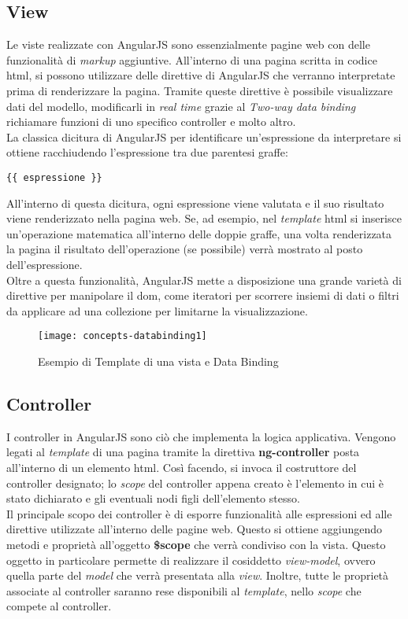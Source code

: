 \subsection{View}
Le viste realizzate con AngularJS sono essenzialmente pagine web con delle funzionalità di \emph{markup} aggiuntive. All'interno di una pagina scritta in codice \gls{html}, si possono utilizzare delle direttive di AngularJS che verranno interpretate prima di renderizzare la pagina. Tramite queste direttive è possibile visualizzare dati del modello, modificarli in \emph{real time} grazie al \emph{Two-way data binding} richiamare funzioni di uno specifico controller e molto altro.\\
La classica dicitura di AngularJS per identificare un'espressione da interpretare si ottiene racchiudendo l'espressione tra due parentesi graffe: 
\begin{verbatim}
{{ espressione }}
\end{verbatim}
All'interno di questa dicitura, ogni espressione viene valutata e il suo risultato viene renderizzato nella pagina web. Se, ad esempio, nel \emph{template} \gls{html} si inserisce un'operazione matematica all'interno delle doppie graffe, una volta renderizzata la pagina il risultato dell'operazione (se possibile) verrà mostrato al posto dell'espressione.\\
Oltre a questa funzionalità, AngularJS mette a disposizione una grande varietà di direttive per manipolare il \gls{dom}\glsfirstoccur, come iteratori per scorrere insiemi di dati o filtri da applicare ad una collezione per limitarne la visualizzazione.

\begin{figure}[!h] 
    \centering 
    \texttt{[image: concepts-databinding1]} 
    \caption{Esempio di Template di una vista e Data Binding}
\end{figure}

\subsection{Controller}
I controller in AngularJS sono ciò che implementa la logica applicativa. Vengono legati al \emph{template} di una pagina tramite la direttiva \textbf{ng-controller} posta all'interno di un elemento \gls{html}. Così facendo, si invoca il costruttore del controller designato; lo \emph{scope} del controller appena creato è l'elemento in cui è stato dichiarato e gli eventuali nodi figli dell'elemento stesso.\\
Il principale scopo dei controller è di esporre funzionalità alle espressioni ed alle direttive utilizzate all'interno delle pagine web. Questo si ottiene aggiungendo metodi e proprietà all'oggetto \textbf{\$scope} che verrà condiviso con la vista. Questo oggetto in particolare permette di realizzare il cosiddetto \emph{view-model}, ovvero quella parte del \emph{model} che verrà presentata alla \emph{view}. Inoltre, tutte le proprietà associate al controller saranno rese disponibili al \emph{template}, nello \emph{scope} che compete al controller.

